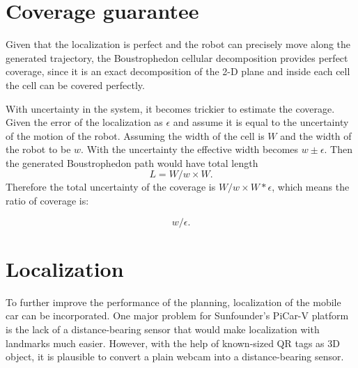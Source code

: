 \documentclass[12pt]{article}
\begin{document}
\section{Coverage guarantee}
Given that the localization is perfect and the robot can precisely move along the generated trajectory, the Boustrophedon cellular decomposition provides perfect coverage, since it is an exact decomposition of the 2-D plane and inside each cell the cell can be covered perfectly. 

With uncertainty in the system, it becomes trickier to estimate the coverage. Given the error of the localization as $\epsilon$ and assume it is equal to the uncertainty of the motion of the robot. Assuming the width of the cell is $W$ and the width of the robot to be $w$. With the uncertainty the effective width becomes $w\pm \epsilon$. Then the generated Boustrophedon path would have total length 
$$L=W/w\times W.$$ Therefore the total uncertainty of the coverage is $W/w\times W *\epsilon$, which means the ratio of coverage is: 

$$w/\epsilon.$$




\section{Localization}
\label{EKF}
To further improve the performance of the planning, localization of the mobile car can be incorporated.
One major problem for Sunfounder's PiCar-V platform is the lack of a distance-bearing sensor that would make localization with landmarks much easier. However, with the help of known-sized QR tags as 3D object, it is plausible to convert a plain webcam into a distance-bearing sensor.
\end{document}

